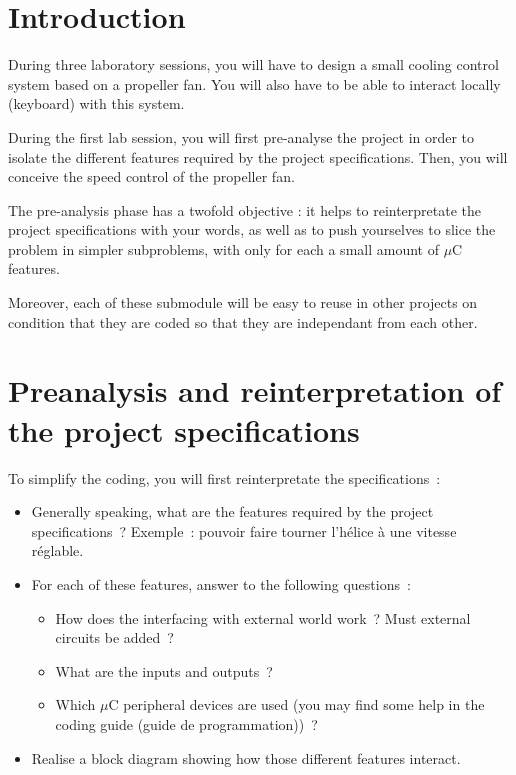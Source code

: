 \documentclass[11pt,a4paper]{article}
\theoremstyle{definition}%
\begin{document}
\section{Introduction}
During three laboratory sessions, you will have to design a small cooling control system based on a propeller fan.
You will also have to be able to interact locally (keyboard) with this system.

During the first lab session, you will first pre-analyse the project in order to isolate the different features required by the project specifications.
Then, you will conceive the speed control of the propeller fan.

The pre-analysis phase has a twofold objective : it helps to reinterpretate the project specifications with your words, as well as to push yourselves to slice the problem in simpler subproblems, with only for each a small amount of $\mu$C features.

Moreover, each of these submodule will be easy to reuse in other projects on condition that they are coded so that they are independant from each other.





\section{Preanalysis and reinterpretation of the project specifications}
To simplify the coding, you will first reinterpretate the specifications~:
\begin{itemize}
	\item Generally speaking, what are the features required by the project specifications~?
	Exemple~: pouvoir faire tourner l’hélice à une vitesse réglable.
	\item For each of these features, answer to the following questions~:
	\begin{itemize}
		\item How does the interfacing with external world work~?
		Must external circuits be added~?
		\item What are the inputs and outputs~?
		\item Which $\mu$C peripheral devices are used (you may find some help in the coding guide (guide de programmation))~?
	\end{itemize}
	\item Realise a block diagram showing how those different features interact.
\end{itemize}
\end{document}
